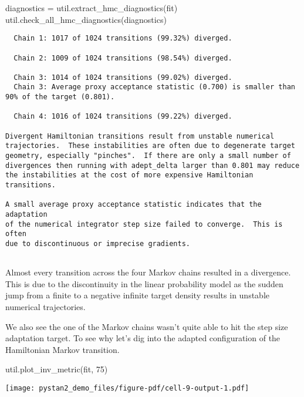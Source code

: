\documentclass[
  letterpaper,
  DIV=11,
  numbers=noendperiod]{scrartcl}
\newenvironment{Shaded}{\begin{snugshade}}{\end{snugshade}}
\newcommand{\DecValTok}[1]{\textcolor[rgb]{0.68,0.00,0.00}{#1}}
\newcommand{\NormalTok}[1]{\textcolor[rgb]{0.00,0.23,0.31}{#1}}
\newcommand{\OperatorTok}[1]{\textcolor[rgb]{0.37,0.37,0.37}{#1}}
\begin{document}
\begin{Shaded}
\begin{Highlighting}[]
\NormalTok{diagnostics }\OperatorTok{=}\NormalTok{ util.extract\_hmc\_diagnostics(fit)}
\NormalTok{util.check\_all\_hmc\_diagnostics(diagnostics)}
\end{Highlighting}
\end{Shaded}

\begin{verbatim}
  Chain 1: 1017 of 1024 transitions (99.32%) diverged.
 
  Chain 2: 1009 of 1024 transitions (98.54%) diverged.
 
  Chain 3: 1014 of 1024 transitions (99.02%) diverged.
  Chain 3: Average proxy acceptance statistic (0.700) is smaller than
90% of the target (0.801).
 
  Chain 4: 1016 of 1024 transitions (99.22%) diverged.
 
Divergent Hamiltonian transitions result from unstable numerical
trajectories.  These instabilities are often due to degenerate target
geometry, especially "pinches".  If there are only a small number of
divergences then running with adept_delta larger than 0.801 may reduce
the instabilities at the cost of more expensive Hamiltonian transitions.
 
A small average proxy acceptance statistic indicates that the adaptation
of the numerical integrator step size failed to converge.  This is often
due to discontinuous or imprecise gradients.
 
\end{verbatim}

Almost every transition across the four Markov chains resulted in a
divergence. This is due to the discontinuity in the linear probability
model as the sudden jump from a finite to a negative infinite target
density results in unstable numerical trajectories.

We also see the one of the Markov chains wasn't quite able to hit the
step size adaptation target. To see why let's dig into the adapted
configuration of the Hamiltonian Markov transition.

\begin{Shaded}
\begin{Highlighting}[]
\NormalTok{util.plot\_inv\_metric(fit, }\DecValTok{75}\NormalTok{)}
\end{Highlighting}
\end{Shaded}

\texttt{[image: pystan2\_demo\_files/figure-pdf/cell-9-output-1.pdf]}
\end{document}
